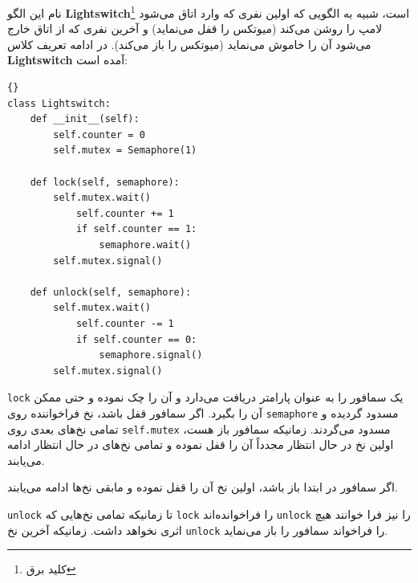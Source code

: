 \documentclass{book}
\begin{document}
    نام این الگو {\bf Lightswitch}\footnote{کلید برق} است، شبیه به الگویی که اولین نفری که وارد اتاق می‌شود لامپ را روشن می‌کند  (میوتکس
    را قفل می‌نماید) و آخرین نفری که از اتاق خارج می‌شود آن را خاموش می‌نماید (میوتکس را باز می‌کند).
    در ادامه تعریف کلاس {\bf Lightswitch} آمده است: 
\begin{latin}
\begin{latin}
\begin{lstlisting}[title={\rl{تعریف} Lightswitch }]{}
class Lightswitch:
    def __init__(self):
        self.counter = 0
        self.mutex = Semaphore(1)

    def lock(self, semaphore):
        self.mutex.wait()
            self.counter += 1
            if self.counter == 1:
                semaphore.wait()
        self.mutex.signal()

    def unlock(self, semaphore):
        self.mutex.wait()
            self.counter -= 1
            if self.counter == 0:
                semaphore.signal()
        self.mutex.signal()
\end{lstlisting}
\end{latin}
\end{latin}

    {\tt lock} 
    یک سمافور را به عنوان پارامتر دریافت می‌دارد و آن را چک نموده و حتی ممکن آن را بگیرد. 
    اگر سمافور قفل باشد، نخ فراخواننده روی  {\tt semaphore} مسدود گردیده و تمامی نخ‌های بعدی روی {\tt self.mutex} مسدود می‌گردند. 
    زمانیکه سمافور باز هست، اولین نخ در حال انتظار مجدداً  آن را قفل نموده و تمامی نخ‌های در حال انتظار ادامه می‌یابند. 

    اگر سمافور در ابتدا باز باشد، اولین نخ آن را قفل نموده و مابقی نخ‌ها ادامه می‌یابند. 

{\tt unlock} 
    تا زمانیکه تمامی نخ‌هایی که {\tt lock} را فراخوانده‌اند {\tt unlock} را نیز فرا خوانند هیچ اثری نخواهد داشت. زمانیکه آخرین نخ {\tt unlock} را 
    فراخواند سمافور را باز می‌نماید. 
\end{document}
